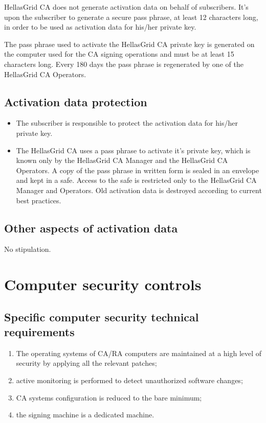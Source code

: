 HellasGrid CA does not generate activation data on behalf of subscribers. It's upon the subscriber to generate a secure pass phrase, at least 12 characters long, in order to be used as activation data for his/her private key.

The pass phrase used to activate the HellasGrid CA private key is generated on the computer used for the CA signing operations and must be at least 15 characters long. Every 180 days the pass phrase is regenerated by one of the HellasGrid CA Operators.

\subsection{Activation data protection}

\begin{itemize}
\item{The subscriber is responsible to protect the activation data for his/her private key.}
\item{The HellasGrid CA uses a pass phrase to activate it's private key, which is known only by the HellasGrid CA Manager and the HellasGrid CA Operators. A copy of the pass phrase in written form  is sealed in an envelope and kept in a safe. Access to the safe is restricted only to the HellasGrid CA Manager and Operators. Old activation data is destroyed according to current best practices.}
\end{itemize}

\subsection{Other aspects of activation data}

No stipulation.

\section{Computer security controls}
\subsection{Specific computer security technical requirements}

\begin{enumerate}
\item{The operating systems of CA/RA computers are maintained at a high level of security by applying all the relevant patches;}
\item{active monitoring is performed to detect unauthorized software changes;}
\item{CA systems configuration is reduced to the bare minimum;}
\item{the signing machine is a dedicated machine.}
\end{enumerate}

